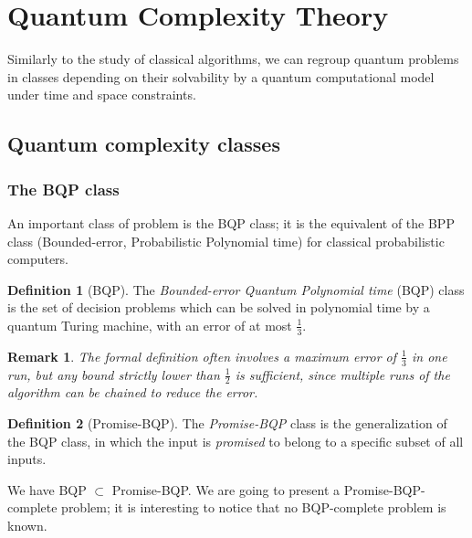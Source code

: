 \documentclass[12pt,a4paper]{article}
\theoremstyle{plain}
\newtheorem*{remark}{Remark}
\theoremstyle{definition}
\newtheorem*{definition}{Definition}
\begin{document}
\section{Quantum Complexity Theory}
Similarly to the study of classical algorithms, we can regroup quantum problems in classes depending on their solvability by a quantum computational model under time and space constraints. 

\subsection{Quantum complexity classes}
\subsubsection{The BQP class}
An important class of problem is the BQP class; it is the equivalent of the BPP class (Bounded-error, Probabilistic Polynomial time) for classical probabilistic computers.

\begin{definition}[BQP] 
    The \emph{Bounded-error Quantum Polynomial time} (BQP) class is the set of decision problems which can be solved in polynomial time by a quantum Turing machine, with an error of at most $\frac{1}{3}$. 
\end{definition}

\begin{remark}
    The formal definition often involves a maximum error of $\frac{1}{3}$ in one run, but any bound strictly lower than $\frac{1}{2}$ is sufficient, since multiple runs of the algorithm can be chained to reduce the error.
\end{remark}

\begin{definition}[Promise-BQP]
    The \emph{Promise-BQP} class is the generalization of the BQP class, in which the input is \emph{promised} to belong to a specific subset of all inputs.
\end{definition}

We have BQP $\subset$ Promise-BQP. We are going to present a Promise-BQP-complete problem; it is interesting to notice that no BQP-complete problem is known.
\end{document}

